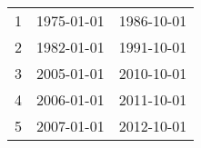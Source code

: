 % 
\begin{tabular}{ccc}
  \hline
  \hline
1 & 1975-01-01 & 1986-10-01 \\ 
  2 & 1982-01-01 & 1991-10-01 \\ 
  3 & 2005-01-01 & 2010-10-01 \\ 
  4 & 2006-01-01 & 2011-10-01 \\ 
  5 & 2007-01-01 & 2012-10-01 \\ 
   \hline
\end{tabular}

